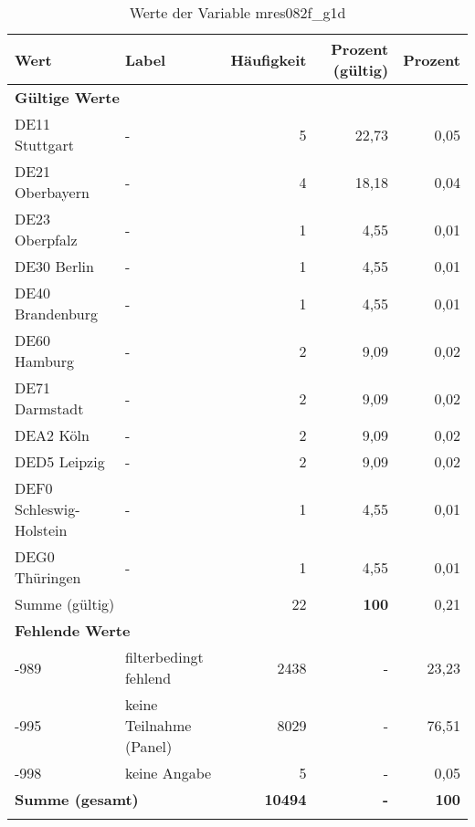      \begin{longtable}{Xlrrr}
     \toprule
     \textbf{Wert} & \textbf{Label} & \textbf{Häufigkeit} & \textbf{Prozent (gültig)} & \textbf{Prozent} \\
     \endhead
     \midrule
     \multicolumn{5}{l}{\textbf{Gültige Werte}}\\

     \multicolumn{1}{X}{DE11 Stuttgart} &
     - &
     5 &
     22,73 &
     0,05 \\

     \multicolumn{1}{X}{DE21 Oberbayern} &
     - &
     4 &
     18,18 &
     0,04 \\

     \multicolumn{1}{X}{DE23 Oberpfalz} &
     - &
     1 &
     4,55 &
     0,01 \\

     \multicolumn{1}{X}{DE30 Berlin} &
     - &
     1 &
     4,55 &
     0,01 \\

     \multicolumn{1}{X}{DE40 Brandenburg} &
     - &
     1 &
     4,55 &
     0,01 \\

     \multicolumn{1}{X}{DE60 Hamburg} &
     - &
     2 &
     9,09 &
     0,02 \\

     \multicolumn{1}{X}{DE71 Darmstadt} &
     - &
     2 &
     9,09 &
     0,02 \\

     \multicolumn{1}{X}{DEA2 Köln} &
     - &
     2 &
     9,09 &
     0,02 \\

     \multicolumn{1}{X}{DED5 Leipzig} &
     - &
     2 &
     9,09 &
     0,02 \\

     \multicolumn{1}{X}{DEF0 Schleswig-Holstein} &
     - &
     1 &
     4,55 &
     0,01 \\

     \multicolumn{1}{X}{DEG0 Thüringen} &
     - &
     1 &
     4,55 &
     0,01 \\
     \midrule
      \multicolumn{2}{l}{Summe (gültig)} & 22 &
      \textbf{100} &
         0,21 \\
     \multicolumn{5}{l}{\textbf{Fehlende Werte}}\\
       -989 & filterbedingt fehlend & 2438 & - & 23,23 \\

       -995 & keine Teilnahme (Panel) & 8029 & - & 76,51 \\

       -998 & keine Angabe & 5 & - & 0,05 \\

     \midrule
     \multicolumn{2}{l}{\textbf{Summe (gesamt)}} & \textbf{10494} & \textbf{-} & \textbf{100} \\
     \bottomrule
     \caption{Werte der Variable mres082f\_g1d}
     \end{longtable}
     
